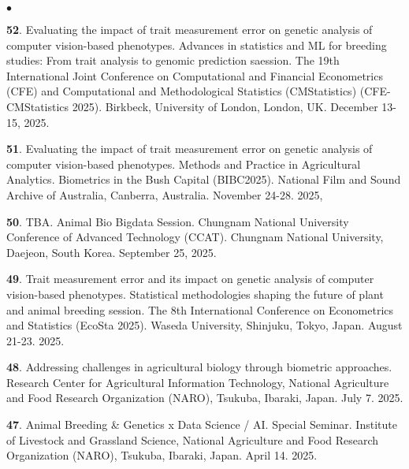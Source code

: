 \documentclass[margin,line,10pt]{res}
\newenvironment{list2}{
  \begin{list}{$\bullet$}{%
      \setlength{\itemsep}{0in}
      \setlength{\parsep}{0in} \setlength{\parskip}{0in}
      \setlength{\topsep}{0in} \setlength{\partopsep}{0in} 
      \setlength{\leftmargin}{0.2in}}}{\end{list}}
\begin{document}
\begin{resume}
\begin{list2}
  \item [{\bf 52}.]  Evaluating the impact of trait measurement error on genetic analysis of computer vision-based phenotypes. Advances in statistics and ML for breeding studies: From trait analysis to genomic prediction saession. The 19th International Joint Conference on Computational and Financial Econometrics (CFE) and Computational and Methodological Statistics (CMStatistics) (CFE-CMStatistics 2025).  Birkbeck, University of London, London, UK. December 13-15, 2025.
  
  \vspace{0.5cm}

  
  \item [{\bf 51}.]  Evaluating the impact of trait measurement error on genetic analysis of computer vision-based phenotypes. Methods and Practice in Agricultural Analytics. Biometrics in the Bush Capital (BIBC2025). National Film and Sound Archive of Australia, Canberra, Australia. November 24-28. 2025,

  \vspace{0.5cm}

   \item [{\bf 50}.] TBA. Animal Bio Bigdata Session. Chungnam National University Conference of Advanced Technology (CCAT). Chungnam National University, Daejeon, South Korea. September 25, 2025. 


  \vspace{0.5cm}

  \item [{\bf 49}.] Trait measurement error and its impact on genetic analysis of computer vision-based phenotypes. Statistical methodologies shaping the future of plant and animal breeding session. The 8th International Conference on Econometrics and Statistics (EcoSta 2025). Waseda University, Shinjuku, Tokyo, Japan. August 21-23. 2025. 

  \vspace{0.5cm}

  \item [{\bf 48}.]  Addressing challenges in agricultural biology through biometric approaches.  Research Center for Agricultural Information Technology, National Agriculture and Food Research Organization (NARO), Tsukuba, Ibaraki, Japan. July 7. 2025.  %


  \vspace{0.5cm}

  \item [{\bf 47}.]  Animal Breeding \& Genetics x Data Science / AI. Special Seminar. Institute of Livestock and Grassland Science, National Agriculture and Food Research Organization (NARO), Tsukuba, Ibaraki, Japan. April 14. 2025. %



\end{list2}
\end{resume}
\end{document}
